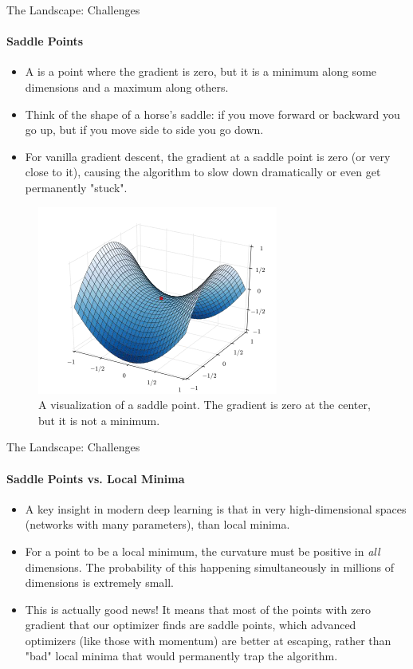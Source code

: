 \begin{frame}{The Landscape: Challenges}
    \framesubtitle{Saddle Points}
    \begin{itemize}
        \item A  is a point where the gradient is zero, but it is a minimum along some dimensions and a maximum along others.
        \item Think of the shape of a horse's saddle: if you move forward or backward you go up, but if you move side to side you go down.
        \item For vanilla gradient descent, the gradient at a saddle point is zero (or very close to it), causing the algorithm to slow down dramatically or even get permanently "stuck".
    \end{itemize}
    \begin{figure}
        \centering
        \includegraphics[width=0.5\linewidth]{images/saddle_point.png}
        \caption{A visualization of a saddle point. The gradient is zero at the center, but it is not a minimum.}
    \end{figure}
\end{frame}

\begin{frame}{The Landscape: Challenges}
    \framesubtitle{Saddle Points vs. Local Minima}
    \begin{itemize}
        \item A key insight in modern deep learning is that in very high-dimensional spaces (networks with many parameters),  than local minima.
        \item For a point to be a local minimum, the curvature must be positive in \emph{all} dimensions. The probability of this happening simultaneously in millions of dimensions is extremely small.
        \item This is actually good news! It means that most of the points with zero gradient that our optimizer finds are saddle points, which advanced optimizers (like those with momentum) are better at escaping, rather than "bad" local minima that would permanently trap the algorithm.
    \end{itemize}
\end{frame}